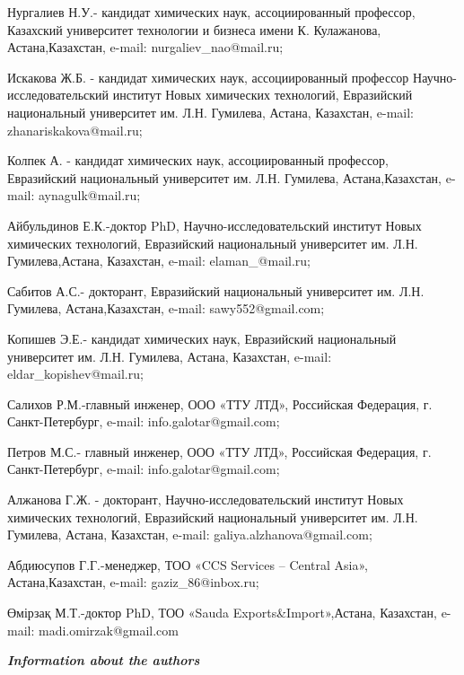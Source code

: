 \begin{noparindent}
Нургалиев Н.У.- кандидат химических наук, ассоциированный профессор,
Казахский университет технологии и бизнеса имени К. Кулажанова,
Астана,Казахстан, e-mail: nurgaliev\_nao@mail.ru;

Искакова Ж.Б. - кандидат химических наук, ассоциированный профессор
Научно-исследовательский институт Новых химических технологий,
Евразийский национальный университет им. Л.Н. Гумилева, Астана,
Казахстан, e-mail: zhanariskakova@mail.ru;

Колпек А. - кандидат химических наук, ассоциированный профессор,
Евразийский национальный университет им. Л.Н. Гумилева,
Астана,Казахстан, e-mail: aynagulk@mail.ru;

Айбульдинов Е.К.-доктор PhD, Научно-исследовательский институт Новых
химических технологий, Евразийский национальный университет им. Л.Н.
Гумилева,Астана, Казахстан, e-mail: elaman\_@mail.ru;

Сабитов А.С.- докторант, Евразийский национальный университет им. Л.Н.
Гумилева, Астана,Казахстан, e-mail: sawy552@gmail.com;

Копишев Э.Е.- кандидат химических наук, Евразийский национальный
университет им. Л.Н. Гумилева, Астана, Казахстан, e-mail:
eldar\_kopishev@mail.ru;

Салихов Р.М.-главный инженер, ООО «ТТУ ЛТД», Российская Федерация, г.
Санкт-Петербург, e-mail: info.galotar@gmail.com;

Петров М.С.- главный инженер, ООО «ТТУ ЛТД», Российская Федерация, г.
Санкт-Петербург, e-mail: info.galotar@gmail.com;

Алжанова Г.Ж. - докторант, Научно-исследовательский институт Новых
химических технологий, Евразийский национальный университет им. Л.Н.
Гумилева, Астана, Казахстан, e-mail: galiya.alzhanova@gmail.com;

Абдиюсупов Г.Г.-менеджер, ТОО «CCS Services -- Central Asia»,
Астана,Казахстан, e-mail: gaziz\_86@inbox.ru;

Өмірзақ М.Т.-доктор PhD, ТОО «Sauda Exports\&Import»,Астана, Казахстан,
e-mail: madi.omirzak@gmail.com
\end{noparindent}

\emph{{\bfseries Information about the authors}}

